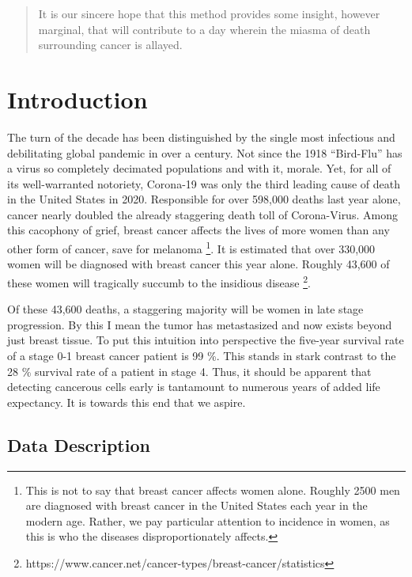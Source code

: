 \documentclass[11pt]{article}
\begin{document}
\begin{abstract}
	It is our sincere hope that this method provides some insight, however marginal, that will contribute to a day wherein the miasma of death surrounding cancer is allayed.  
	
\end{abstract}

\section{Introduction}

The turn of the decade has been distinguished by the single most infectious and debilitating global pandemic in over a century.  Not since the 1918 “Bird-Flu” has a virus so completely decimated populations and with it, morale.  Yet, for all of its well-warranted notoriety, Corona-19 was only the third leading cause of death in the United States in 2020.  Responsible for over 598,000 deaths last year alone, cancer nearly doubled the already staggering death toll of Corona-Virus.  Among this cacophony of grief, breast cancer affects the lives of more women than any other form of cancer, save for melanoma \footnote{This is not to say that breast cancer affects women alone.  Roughly 2500 men are diagnosed with breast cancer in the United States each year in the modern age.  Rather, we pay particular attention to incidence in women, as this is who the diseases disproportionately affects.}.  It is estimated that over 330,000 women will be diagnosed with breast cancer this year alone.  Roughly 43,600 of these women will tragically succumb to the insidious disease \footnote{https://www.cancer.net/cancer-types/breast-cancer/statistics}.  

	Of these 43,600 deaths, a staggering majority will be women in late stage progression.  By this I mean the tumor has metastasized and now exists beyond just breast tissue.  To put this intuition into perspective the five-year survival rate of a stage 0-1 breast cancer patient is 99 \%.  This stands in stark contrast to the 28 \% survival rate of a patient in stage 4.  Thus, it should be apparent that detecting cancerous cells early is tantamount to numerous years of added life expectancy.  It is towards this end that we aspire.  
	
\subsection{Data Description}
\end{document}
